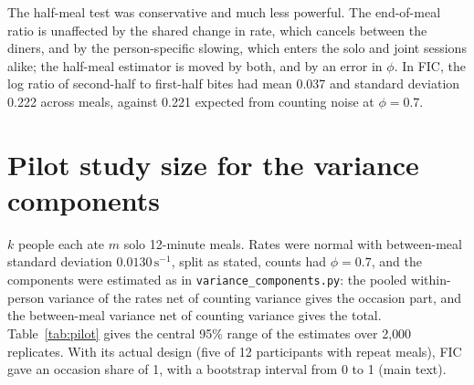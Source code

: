 \documentclass[12pt]{article}
\theoremstyle{definition}
\begin{document}
The half-meal test was conservative and much less powerful. The end-of-meal ratio is
unaffected by the shared change in rate, which cancels between the diners, and by
the person-specific slowing, which enters the solo and joint sessions alike; the
half-meal estimator is moved by both, and by an error in $\phi$. In FIC, the log
ratio of second-half to first-half bites had mean 0.037 and standard deviation
0.222 across meals, against 0.221 expected from counting noise at $\phi=0.7$.

\section{Pilot study size for the variance components}\label{sec:pilot}

$k$ people each ate $m$ solo 12-minute meals. Rates were normal with between-meal
standard deviation $0.0130\,\mathrm{s}^{-1}$, split as stated, counts had
$\phi=0.7$, and the components were estimated as in \texttt{variance\_components.py}:
the pooled within-person variance of the rates net of counting variance gives the
occasion part, and the between-meal variance net of counting variance gives the
total. Table~\ref{tab:pilot} gives the central 95\% range of the estimates over
2{,}000 replicates. With its actual design (five of 12 participants with repeat
meals), FIC gave an occasion share of 1, with a bootstrap interval from 0 to 1
(main text).
\end{document}
